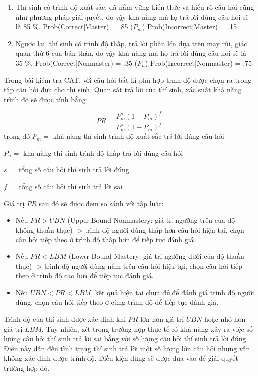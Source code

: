 \begin{enumerate}
	\item Thí sinh có trình độ xuất sắc, đã nắm vững kiến thức và hiểu rõ câu hỏi cũng như phương pháp giải quyết, do vậy khả năng mà họ trả lời đúng câu hỏi sẽ là 85 \%. 
		\subitem Prob(Correct|Master) = .85 ($P_m$)
		\subitem Prob(Incorrect|Master) = .15
	\item Ngược lại, thí sinh có trình độ thấp, trả lời phần lớn dựa trên may rủi, giác quan thứ 6 của bản thân, do vậy khả năng mà họ trả lời đúng câu hỏi sẽ là 35 \%. 
		\subitem Prob(Correct|Nonmaster) = .35 ($P_n$)
		\subitem Prob(Incorrect|Nonmaster) = .75
\end{enumerate}  

Trong bài kiểm tra CAT, với câu hỏi bất kì phù hợp trình độ được chọn ra trong tập câu hỏi đưa cho thí sinh. Quan sát trả lời của thí sinh, xác suất khả năng trình độ sẽ được tính bằng:

\begin{equation}
PR = \dfrac{P_m^s(1-P_m)^f}{P_m^s(1-P_m)^f}
\end{equation}
trong đó $P_m = $ khả năng thí sinh trình độ xuất sắc trả lời đúng câu hỏi

$P_n = $ khả năng thí sinh trình độ thấp trả lời đúng câu hỏi

$s = $ tổng số câu hỏi thí sinh trả lời đúng 

$f = $ tổng số câu hỏi thí sinh trả lời sai 

Giá trị $PR$ sau đó sẽ được đem so sánh với tập luật:
\begin{itemize}
	\item Nếu $PR > UBN$ (Upper Bound Nonmastery: giá trị ngưỡng trên của độ không thuần thục) -> trình độ người dùng thấp hơn câu hỏi hiện tại, chọn câu hỏi tiếp theo ở trình độ thấp hơn để tiếp tục đánh giá .
	\item Nếu $PR < LBM$ (Lower Bound Mastery: giá trị ngưỡng dưới của độ thuần thục) -> trình độ người dùng nằm trên câu hỏi hiện tại, chọn câu hỏi tiếp theo ở trình độ cao hơn để tiếp tục đánh giá. 
	\item Nếu $UBN < PR < LBM$, kết quả hiện tại chưa đủ để đánh giá trình độ người dùng, chọn câu hỏi tiếp theo ở cùng trình độ để tiếp tục đánh giá.  
\end{itemize}


Trình độ của thí sinh được xác định khi $PR$ lớn hơn giá trị $UBN$ hoặc nhỏ hơn giá trị $LBM$. Tuy nhiên, xét trong trường hợp thực tế có khả năng xảy ra việc số lượng câu hỏi thí sinh trả lời sai bằng với số lượng câu hỏi thí sinh trả lời đúng. Điều này dẫn đến tình trạng thí sinh trả lời một số lượng lớn câu hỏi nhưng vẫn không xác định được trình độ. Điều kiện dừng sẽ được đưa vào để giải quyết trường hợp đó.

